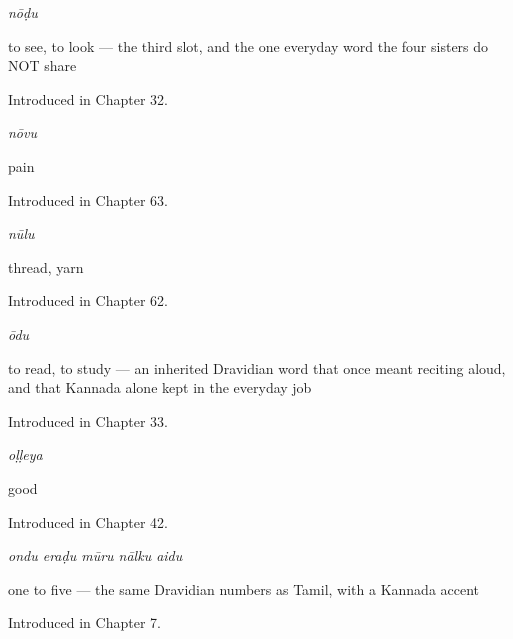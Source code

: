 \noindent\begin{minipage}[t]{\linewidth}
\raggedright
\textbf{}\enspace\emph{nōḍu}\par
\small to see, to look — the third slot, and the one everyday word the four sisters do NOT share\par
\footnotesize Introduced in Chapter 32.
\end{minipage}\par\medskip

\noindent\begin{minipage}[t]{\linewidth}
\raggedright
\textbf{}\enspace\emph{nōvu}\par
\small pain\par
\footnotesize Introduced in Chapter 63.
\end{minipage}\par\medskip

\noindent\begin{minipage}[t]{\linewidth}
\raggedright
\textbf{}\enspace\emph{nūlu}\par
\small thread, yarn\par
\footnotesize Introduced in Chapter 62.
\end{minipage}\par\medskip

\noindent\begin{minipage}[t]{\linewidth}
\raggedright
\textbf{}\enspace\emph{ōdu}\par
\small to read, to study — an inherited Dravidian word that once meant reciting aloud, and that Kannada alone kept in the everyday job\par
\footnotesize Introduced in Chapter 33.
\end{minipage}\par\medskip

\noindent\begin{minipage}[t]{\linewidth}
\raggedright
\textbf{}\enspace\emph{oḷḷeya}\par
\small good\par
\footnotesize Introduced in Chapter 42.
\end{minipage}\par\medskip

\noindent\begin{minipage}[t]{\linewidth}
\raggedright
\textbf{    }\enspace\emph{ondu eraḍu mūru nālku aidu}\par
\small one to five — the same Dravidian numbers as Tamil, with a Kannada accent\par
\footnotesize Introduced in Chapter 7.
\end{minipage}\par\medskip

